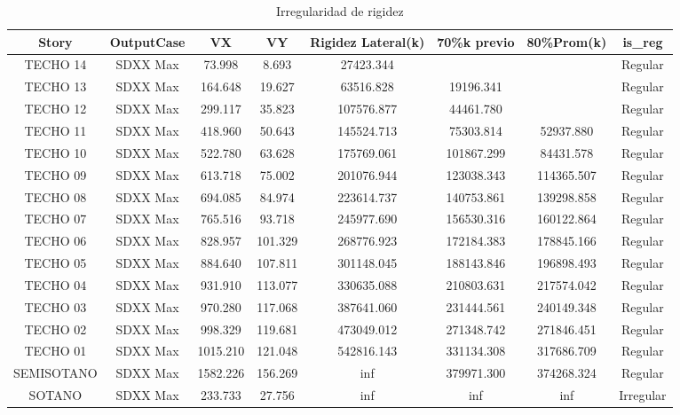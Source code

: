 \documentclass{article}%
\begin{document}
\begin{table}[h!]%
\centering%
\caption{Irregularidad de rigidez}%
\begin{tabular}{cccccccc}
\toprule
Story & OutputCase & VX & VY & Rigidez Lateral(k) & 70\%k previo & 80\%Prom(k) & is\_reg \\
\midrule
TECHO 14 & SDXX Max & 73.998 & 8.693 & 27423.344 &  &  & Regular \\
TECHO 13 & SDXX Max & 164.648 & 19.627 & 63516.828 & 19196.341 &  & Regular \\
TECHO 12 & SDXX Max & 299.117 & 35.823 & 107576.877 & 44461.780 &  & Regular \\
TECHO 11 & SDXX Max & 418.960 & 50.643 & 145524.713 & 75303.814 & 52937.880 & Regular \\
TECHO 10 & SDXX Max & 522.780 & 63.628 & 175769.061 & 101867.299 & 84431.578 & Regular \\
TECHO 09 & SDXX Max & 613.718 & 75.002 & 201076.944 & 123038.343 & 114365.507 & Regular \\
TECHO 08 & SDXX Max & 694.085 & 84.974 & 223614.737 & 140753.861 & 139298.858 & Regular \\
TECHO 07 & SDXX Max & 765.516 & 93.718 & 245977.690 & 156530.316 & 160122.864 & Regular \\
TECHO 06 & SDXX Max & 828.957 & 101.329 & 268776.923 & 172184.383 & 178845.166 & Regular \\
TECHO 05 & SDXX Max & 884.640 & 107.811 & 301148.045 & 188143.846 & 196898.493 & Regular \\
TECHO 04 & SDXX Max & 931.910 & 113.077 & 330635.088 & 210803.631 & 217574.042 & Regular \\
TECHO 03 & SDXX Max & 970.280 & 117.068 & 387641.060 & 231444.561 & 240149.348 & Regular \\
TECHO 02 & SDXX Max & 998.329 & 119.681 & 473049.012 & 271348.742 & 271846.451 & Regular \\
TECHO 01 & SDXX Max & 1015.210 & 121.048 & 542816.143 & 331134.308 & 317686.709 & Regular \\
SEMISOTANO & SDXX Max & 1582.226 & 156.269 & inf & 379971.300 & 374268.324 & Regular \\
SOTANO & SDXX Max & 233.733 & 27.756 & inf & inf & inf & Irregular \\
\bottomrule
\end{tabular}
%
\end{table}

%
\end{document}
